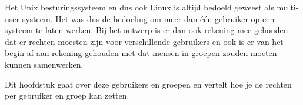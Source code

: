 Het Unix besturingssysteem en dus ook Linux is altijd bedoeld geweest als multi-user systeem. Het was dus de bedoeling om meer dan \'e\'en gebruiker op een systeem te laten werken. Bij het ontwerp is er dan ook rekening mee gehouden dat er rechten moesten zijn voor verschillende gebruikers en ook is er van het begin af aan rekening gehouden met dat mensen in groepen zouden moeten kunnen samenwerken.

Dit hoofdstuk gaat over deze gebruikers en groepen en vertelt hoe je de rechten per gebruiker en groep kan zetten.
